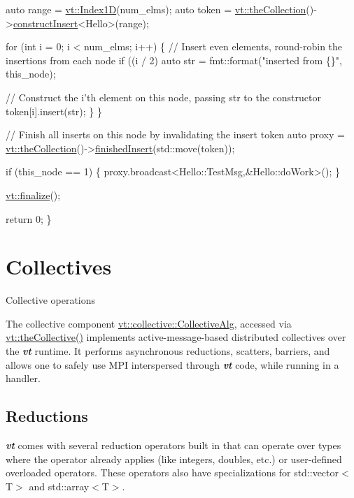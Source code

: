 \begin{DoxyCodeInclude}
  \textcolor{keyword}{auto} range = \hyperlink{namespacevt_a5540efc78234273e1796fb003fe4d234}{vt::Index1D}(num\_elms);
  \textcolor{keyword}{auto} token = \hyperlink{namespacevt_a1c45ce63bfd2c327ff7d76a319a371d8}{vt::theCollection}()->\hyperlink{structvt_1_1vrt_1_1collection_1_1_collection_manager_a0e15cc861c0d979d8977b226efd7c271}{constructInsert}<Hello>(range);

  \textcolor{keywordflow}{for} (\textcolor{keywordtype}{int} i = 0; i < num\_elms; i++) \{
    \textcolor{comment}{// Insert even elements, round-robin the insertions from each node}
    \textcolor{keywordflow}{if} ((i / 2) %
      \textcolor{keyword}{auto} str = fmt::format(\textcolor{stringliteral}{"inserted from \{\}"}, this\_node);

      \textcolor{comment}{// Construct the i'th element on this node, passing str to the constructor}
      token[i].insert(str);
    \}
  \}

  \textcolor{comment}{// Finish all inserts on this node by invalidating the insert token}
  \textcolor{keyword}{auto} proxy = \hyperlink{namespacevt_a1c45ce63bfd2c327ff7d76a319a371d8}{vt::theCollection}()->\hyperlink{structvt_1_1vrt_1_1collection_1_1_collection_manager_a9275a4f6a7c33389813ba7fe4cc75d7e}{finishedInsert}(std::move(token));

  \textcolor{keywordflow}{if} (this\_node == 1) \{
    proxy.broadcast<Hello::TestMsg,&Hello::doWork>();
  \}

  \hyperlink{namespacevt_a540d90dbd6e97b69f1dcbc9ee9314cff}{vt::finalize}();

  \textcolor{keywordflow}{return} 0;
\}
\end{DoxyCodeInclude}
\hypertarget{collective}{}\section{Collectives}\label{collective}
Collective operations

The collective component {\ttfamily \hyperlink{structvt_1_1collective_1_1_collective_alg}{vt\+::collective\+::\+Collective\+Alg}}, accessed via {\ttfamily \hyperlink{namespacevt_aa8e0c0ab253e7ad1acd5d09e36fea769}{vt\+::the\+Collective()}} implements active-\/message-\/based distributed collectives over the {\bfseries {\itshape vt}} runtime. It performs asynchronous reductions, scatters, barriers, and allows one to safely use M\+PI interspersed through {\bfseries {\itshape vt}} code, while running in a handler.\hypertarget{collective_collective-reductions}{}\subsection{Reductions}\label{collective_collective-reductions}
{\bfseries {\itshape vt}} comes with several reduction operators built in that can operate over types where the operator already applies (like integers, doubles, etc.) or user-\/defined overloaded operators. These operators also have specializations for {\ttfamily std\+::vector$<$T$>$} and {\ttfamily std\+::array$<$T$>$}.

